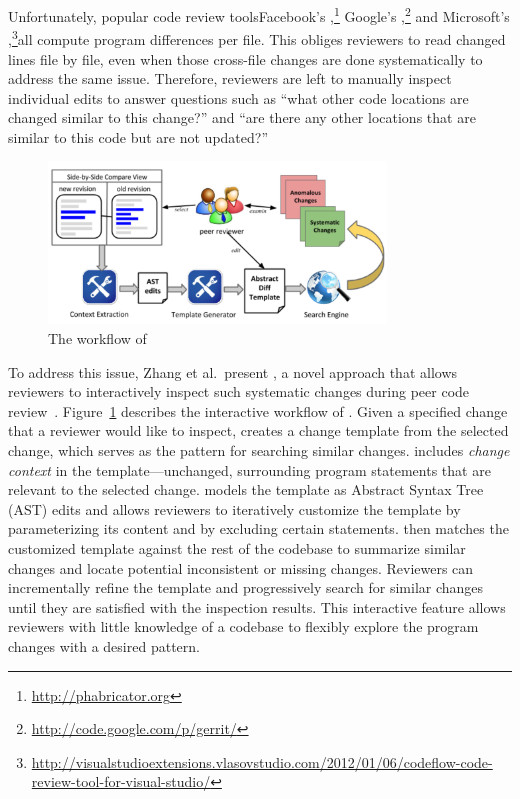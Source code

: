 \documentclass[11pt]{article}
\begin{document}
Unfortunately, popular code review tools\textemdash Facebook's {\phabricator},\footnote{\url{http://phabricator.org}} Google's {\gerrit},\footnote{\url{http://code.google.com/p/gerrit/}} and Microsoft's {\codeflow},\footnote{\url{http://visualstudioextensions.vlasovstudio.com/2012/01/06/codeflow-code-review-tool-for-visual-studio/}}\textemdash all compute program differences per file. This obliges reviewers to read changed lines file by file, even when those cross-file changes are done systematically to address the same issue. Therefore, reviewers are left to manually inspect individual edits to answer questions such as ``what other code locations are changed similar to this change?'' and ``are there any other locations that are similar to this code but are not updated?''

\begin{figure}[ht]
 \centering
 \includegraphics[width=0.8\textwidth]{critics-workflow.pdf}
 \caption{The workflow of {\critics}}
 \label{fig:critics-workflow}
\end{figure}

To address this issue, Zhang et al.~present {\critics}, a novel approach that allows reviewers to interactively inspect such systematic changes during peer code review~\cite{zhang2015interactive}. Figure~\ref{fig:critics-workflow} describes the interactive workflow of {\critics}. Given a specified change that a reviewer would like to inspect, {\critics} creates a change template from the selected change, which serves as the pattern for searching similar changes. {\critics} includes {\em change context} in the template---unchanged, surrounding program statements that are relevant to the selected change. {\critics} models the template as Abstract Syntax Tree (AST) edits and allows reviewers to iteratively customize the template by parameterizing its content and by excluding certain statements. {\critics} then matches the customized template against the rest of the codebase to summarize similar changes and locate potential inconsistent or missing changes. Reviewers can incrementally refine the template and progressively search for similar changes until they are satisfied with the inspection results. This interactive feature allows reviewers with little knowledge of a codebase to flexibly explore the program changes with a desired pattern.
\end{document}

